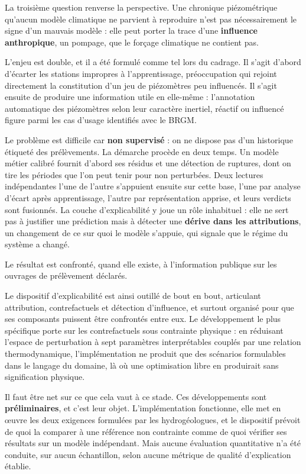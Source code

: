 La troisième question renverse la perspective. Une chronique piézométrique qu'aucun modèle
climatique ne parvient à reproduire n'est pas nécessairement le signe d'un mauvais modèle : elle
peut porter la trace d'une \textbf{influence anthropique}, un pompage, que le forçage
climatique ne contient pas.

L'enjeu est double, et il a été formulé comme tel lors du cadrage. Il s'agit d'abord d'écarter
les stations impropres à l'apprentissage, préoccupation qui rejoint directement la constitution
d'un jeu de piézomètres peu influencés. Il s'agit ensuite de produire une information utile en
elle-même : l'annotation automatique des piézomètres selon leur caractère inertiel, réactif ou
influencé figure parmi les cas d'usage identifiés avec le BRGM.

Le problème est difficile car \textbf{non supervisé} : on ne dispose pas d'un historique
étiqueté des prélèvements. La démarche procède en deux temps. Un modèle métier calibré fournit d'abord ses résidus et une
détection de ruptures, dont on tire les périodes que l'on peut tenir pour non perturbées.
Deux lectures indépendantes l'une de l'autre s'appuient ensuite sur cette base, l'une par analyse
d'écart après apprentissage, l'autre par représentation apprise, et leurs verdicts sont fusionnés. La couche
d'explicabilité y joue un rôle inhabituel : elle ne sert pas à justifier une prédiction mais à
détecter une \textbf{dérive dans les attributions}, un changement de ce sur quoi le modèle
s'appuie, qui signale que le régime du système a changé.

Le résultat est confronté, quand elle existe, à l'information publique sur les ouvrages de
prélèvement déclarés.

Le dispositif d'explicabilité est ainsi outillé de bout en bout, articulant attribution,
contrefactuels et détection d'influence, et surtout organisé pour que ses composants puissent
être confrontés entre eux. Le développement le plus spécifique porte sur les contrefactuels sous
contrainte physique : en réduisant l'espace de perturbation à sept paramètres interprétables
couplés par une relation thermodynamique, l'implémentation ne produit que des scénarios
formulables dans le langage du domaine, là où une optimisation libre en produirait sans
signification physique.

Il faut être net sur ce que cela vaut à ce stade. Ces développements sont \textbf{préliminaires},
et c'est leur objet. L'implémentation fonctionne, elle met en œuvre les deux exigences formulées
par les hydrogéologues, et le dispositif prévoit de quoi la comparer à une référence non
contrainte comme de quoi vérifier ses résultats sur un modèle indépendant. Mais aucune
évaluation quantitative n'a été conduite, sur aucun échantillon, selon aucune métrique de
qualité d'explication établie.

